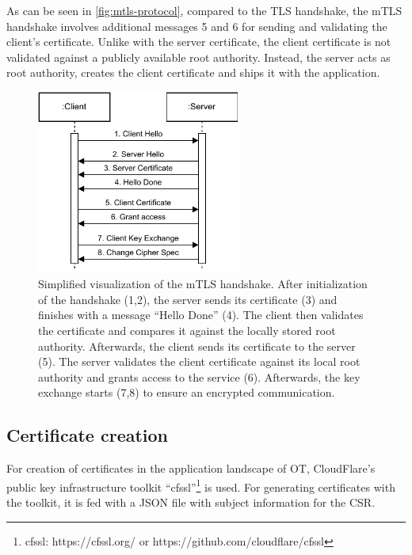 As can be seen in \autoref{fig:mtls-protocol}, compared to the \ac{TLS} handshake, the \ac{mTLS} handshake involves additional messages 5 and 6 for sending and validating the client's certificate.
Unlike with the server certificate, the client certificate is not validated against a publicly available root authority\cite{Cloudflare.20230309, Rescorla.2018}. Instead, the server acts as root authority, creates the client certificate and ships it with the application\cite{Cloudflare.20230309}.


\begin{figure}[ht]
	\centering
	\includegraphics[width=0.6\textwidth]{Figures/mtls.pdf}
	\caption{Simplified visualization of the \ac{mTLS} handshake\cite{Cloudflare.20230309, Rescorla.2018}. After initialization of the handshake (1,2), the server sends its certificate (3) and finishes with a message \enquote{Hello Done} (4). The client then validates the certificate and compares it against the locally stored root authority. Afterwards, the client sends its certificate to the server (5). The server validates the client certificate against its local root authority and grants access to the service (6). Afterwards, the key exchange starts (7,8) to ensure an encrypted communication.}
	\label{fig:mtls-protocol}
\end{figure}


\subsection{Certificate creation}
For creation of certificates in the application landscape of \ac{OT}, CloudFlare's public key infrastructure toolkit \enquote{cfssl}\footnote{cfssl: https://cfssl.org/ or https://github.com/cloudflare/cfssl} is used.
For generating certificates with the toolkit, it is fed with a JSON file with subject information for the \ac{CSR}.

